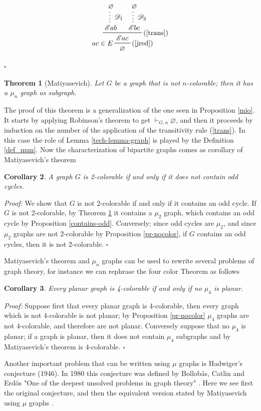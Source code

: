\documentclass[a4paper,12pt,oneside]{book}
\newtheorem{theorem}{Theorem}[chapter]
\newtheorem{corollary}[theorem]{Corollary}
\newcommand{\E}{\mathscr{E}}
\newcommand{\D}{\mathscr{D}}
\newcommand*{\QED}{\hfill\ensuremath{\square}}
\let\emptyset\varnothing
\begin{document}
\begin{equation*}
\prftree[l,r]{(\ref{jred})} {$ac\in E$}
{  \prftree[r]{(\ref{trans})}  
{  \prfsummary[$\D_1$]{\emptyset}{\E ab } }{ \prfsummary[$\D_2$]{\emptyset}{\E bc  }} 
 {\E ac } } 
{\emptyset}
\end{equation*}

\QED

\newpage
\begin{theorem}[Matiyasevich]\label{mati-thm}
Let $G$ be a graph that is not $n$-colorable; then it has a $\mu_n$ graph as subgraph.
\end{theorem}
The proof of this theorem is a generalization of the one seen in Proposition \ref{mio}. It starts by applying Robinson's theorem to get $\vdash_{G,n}\emptyset$, and then it proceeds by induction on the number of the application of the transitivity rule (\ref{trans}). In this case the role of Lemma \ref{tech-lemma-graph} is played by the Definition \ref{def_mun}. Now the characterization of bipartite graphs comes as corollary of Matiyasevich's theorem

\begin{corollary}
A graph $G$ is 2-colorable if and only if it does not contain odd cycles.
\end{corollary}
\textit{Proof:}
We show that $G$ is not 2-colorable if and only if it contains an odd cycle.
If $G$ is not 2-colorable, by Theorem \ref{mati-thm} it contains a $\mu_2$ graph, which contains an odd cycle by Proposition \ref{contains-odd}. Conversely; since odd cycles are $\mu_2$, and since $\mu_2$ graphs are not 2-colorable by Proposition \ref{pr-nocolor}, if $G$  contains an odd cycles, then it is not 2-colorable. \QED

Matiyasevich's theorem and $\mu_n$ graphs can be used to rewrite several problems of graph theory, for instance we can rephrase the four color Theorem as follows

\begin{corollary}\label{cor-4}
Every planar graph is 4-colorable if and only if no $\mu_4$ is planar.
\end{corollary}
\textit{Proof:}
Suppose first that every planar graph is 4-colorable, then every graph which is not 4-colorable is not planar; by Proposition \ref{pr-nocolor} $\mu_4$ graphs are not 4-colorable, and therefore are not planar.
Conversely suppose that no $\mu_4$ is planar; if a graph is planar, then it does not contain $\mu_4$ subgraphs and by Matiyasevich's theorem is 4-colorable.
\QED

\newpage
Another important problem that can be written using $\mu$ graphs is Hadwiger's conjecture (1946)\cite{hadwiger}. In 1980 this conjecture was defined by Bollobás, Catlin and  Erd\"os  "One of the deepest unsolved problems in graph theory" \cite{erdos}. Here we see first the original conjecture, and then the equivalent version stated by Matiyasevich using $\mu$ graphs \cite{mat-2}.
\end{document}
